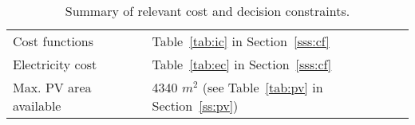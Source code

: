 \begin{table}[htp]
	\centering
	\caption{Summary of relevant cost and decision constraints.}
	\label{tab:cc_sa}
	\begin{tabular}{ll}
		\toprule
		Cost functions         & Table~\ref{tab:ic} in Section~\ref{sss:cf}         \\
		Electricity cost       & Table~\ref{tab:ec} in Section~\ref{sss:cf}       \\
		Max. PV area available & 4340 $m^2$ (see Table~\ref{tab:pv} in Section~\ref{ss:pv})\\ 
		\bottomrule
	\end{tabular}
\end{table}